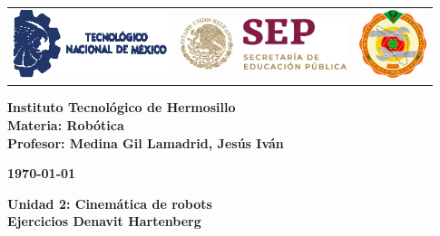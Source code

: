\begin{titlepage}
	\centering
	\begin{tabular}{@{}p{} p{} p{}@{}}
		\includegraphics[height=2cm]{tecnm} & 
		\centering \includegraphics[height=1.5cm]{SEP} & 
		\raggedleft \includegraphics[height=2cm]{ith.jpg} \\
	\end{tabular}
	
	\vspace{2em}
	
	\noindent
	\begin{minipage}[t]{0.48\textwidth}
		\raggedright
		\small \textbf{%
			Instituto Tecnológico de Hermosillo\\
			Materia: Robótica\\
			Profesor: Medina Gil Lamadrid, Jesús Iván%
		}
	\end{minipage}%
	\hfill
	\begin{minipage}[t]{0.48\textwidth}
		\raggedleft
		\small \textbf{\today}
	\end{minipage}
	
	\vspace{2em}
	
	{\large \textbf{Unidad 2: Cinemática de robots}}\\
	\vspace{0.3cm}
	{\Huge \textbf{Ejercicios Denavit Hartenberg}}
	

\end{titlepage}
